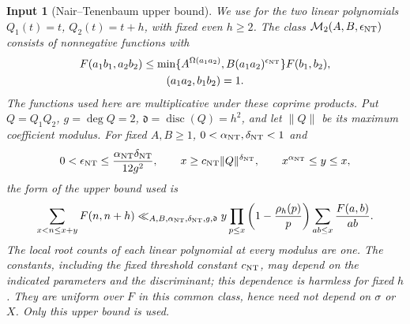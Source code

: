 \documentclass[11pt]{article}
\newtheorem{inputthm}[theorem]{Input}
\theoremstyle{definition}
\theoremstyle{remark}
\numberwithin{equation}{section}
\begin{document}
\begin{inputthm}[Nair--Tenenbaum upper bound]\label{input:nt}
We use \cite[Theorem~1]{Henriot} for the two linear polynomials
$Q_1(t)=t$, $Q_2(t)=t+h$, with fixed even $h\ge2$.
The class $\mathcal M_2(A,B,\epsilon_{\rm NT})$ consists of nonnegative functions with
\begin{equation}\label{eq:nt-class}
\begin{gathered}
 F(a_1b_1,a_2b_2)\le
 \min\{A^{\Omega(a_1a_2)},B(a_1a_2)^{\epsilon_{\rm NT}}\}F(b_1,b_2),\\
 (a_1a_2,b_1b_2)=1.
\end{gathered}
\end{equation}
The functions used here are multiplicative under these coprime products.
Put $Q=Q_1Q_2$, $g=\deg Q=2$, $\mathfrak d=\operatorname{disc}(Q)=h^2$, and let $\|Q\|$ be
its maximum coefficient modulus. For fixed $A,B\ge1$, $0<\alpha_{\rm NT},\delta_{\rm NT}<1$ and
\begin{equation}\label{eq:nt-parameters}
 0<\epsilon_{\rm NT}\le\frac{\alpha_{\rm NT}\delta_{\rm NT}}{12g^2},\qquad
 x\ge c_{\rm NT}\|Q\|^{\delta_{\rm NT}},\qquad x^{\alpha_{\rm NT}}\le y\le x,
\end{equation}
the form of the upper bound used is
\begin{equation}\label{eq:nt-upper}
 \sum_{x<n\le x+y}F(n,n+h)
 \ll_{A,B,\alpha_{\rm NT},\delta_{\rm NT},g,\mathfrak d}
 y\prod_{p\le x}\left(1-\frac{\rho_h(p)}p\right)
 \sum_{ab\le x}\frac{F(a,b)}{ab}.
\end{equation}
The local root counts of each linear polynomial at every modulus are one.
The constants, including the fixed threshold constant $c_{\rm NT}$, may depend on the indicated
parameters and the discriminant; this dependence is harmless for fixed $h$.
They are uniform over $F$ in this common class, hence need not depend on $\sigma$ or $X$.
Only this upper bound is used.
\end{inputthm}
\end{document}
